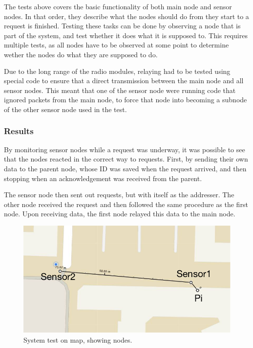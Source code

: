The tests above covers the basic functionality of both main node and sensor nodes. In that order, they describe what the nodes should do from they start to a request is finished.
Testing these tasks can be done by observing a node that is part of the system, and test whether it does what it is supposed to. This requires multiple tests, as all nodes have to be observed at some point to determine wether the nodes do what they are supposed to do.

Due to the long range of the radio modules, relaying had to be tested using special code to ensure that a direct transmission between the main node and all sensor nodes. This meant that one of the sensor node were running code that ignored packets from the main node, to force that node into becoming a subnode of the other sensor node used in the test.

\subsubsection*{Results}
By monitoring sensor nodes while a request was underway, it was possible to see that the nodes reacted in the correct way to requests. First, by sending their own data to the parent node, whose ID was saved when the request arrived, and then stopping when an acknowledgement was received from the parent.

The sensor node then sent out requests, but with itself as the addresser. The other node received the request and then followed the same procedure as the first node. Upon receiving data, the first node relayed this data to the main node.

\begin{figure}[h!]
\centering
\includegraphics[width=1\textwidth]{chapters/test/figures/systest.png}
\caption{System test on map, showing nodes.}
\label{fig:systest}
\end{figure}

